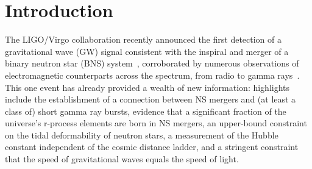 \documentclass[prd,aps,floatfix,superscriptaddress,nofootinbib,twocolumn,10pt,English]{revtex4-1}
\begin{document}
{\begin{abstract}
\end{abstract}

\maketitle 

\section{Introduction}

The LIGO/Virgo collaboration recently announced the first detection of
a gravitational wave (GW) signal consistent with the inspiral
and merger of a binary neutron star (BNS) system~\cite{TheLIGOScientific:2017qsa},
corroborated by numerous observations of electromagnetic
counterparts across the spectrum, from radio to gamma rays~\cite{GBM:2017lvd}.
This one event has already provided a wealth of new information: highlights include
the establishment of a connection between NS mergers and (at least a class of) short gamma ray bursts,
evidence that a significant fraction of the universe's r-process elements
are born in NS mergers, an upper-bound constraint on the tidal deformability of neutron stars,
a measurement of the Hubble constant independent of the cosmic distance ladder, 
and a stringent constraint that the speed of gravitational waves equals the speed of light.

}
\end{document}

